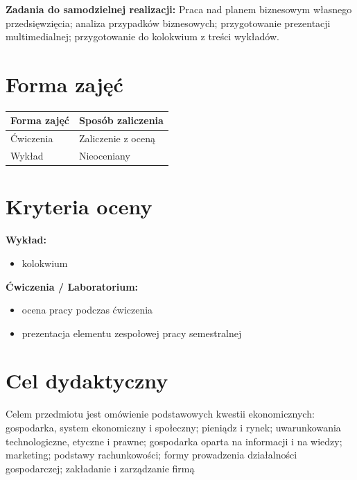 \documentclass[12pt, a4paper]{article}
\newcommand{\thdrule}{\noalign{\global\setlength{\extrarowheight}{0pt}}}
\newcommand{\thdend}{\noalign{\global\setlength{\extrarowheight}{3pt}}}
\begin{document}
\vspace{4pt}
\noindent\textbf{Zadania do samodzielnej realizacji:} Praca nad planem biznesowym własnego przedsięwzięcia; analiza przypadków biznesowych; przygotowanie prezentacji multimedialnej; przygotowanie do kolokwium z treści wykładów.

\section{Forma zajęć}

\begin{center}
{\scriptsize
\begin{tabular}{m{5cm}m{8cm}}
\thdrule\toprule
\rowcolor{pjatkRed} {\color{white}\textbf{Forma zajęć}} & {\color{white}\textbf{Sposób zaliczenia}} \\
\midrule\thdend
  \rowcolor{tableRowLight} Ćwiczenia & Zaliczenie z oceną \\
  \rowcolor{tableRowAlt} Wykład & Nieoceniany \\
\bottomrule
\end{tabular}}
\end{center}

\section{Kryteria oceny}

\textbf{Wykład:}
\begin{itemize}
  \item kolokwium
\end{itemize}
\vspace{4pt}
\textbf{Ćwiczenia / Laboratorium:}
\begin{itemize}
  \item ocena pracy podczas ćwiczenia
  \item prezentacja elementu zespołowej pracy semestralnej
\end{itemize}


\section{Cel dydaktyczny}

Celem przedmiotu jest omówienie podstawowych kwestii ekonomicznych: gospodarka, system ekonomiczny i społeczny; pieniądz i rynek; uwarunkowania technologiczne, etyczne i prawne; gospodarka oparta na informacji i na wiedzy; marketing; podstawy rachunkowości; formy prowadzenia działalności gospodarczej; zakładanie i zarządzanie firmą
\end{document}
